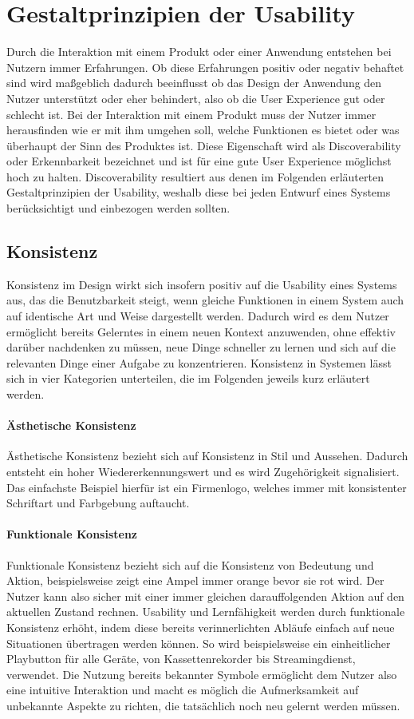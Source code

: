 \section{Gestaltprinzipien der Usability}
Durch die Interaktion mit einem Produkt oder einer Anwendung entstehen bei Nutzern immer Erfahrungen.
Ob diese Erfahrungen positiv oder negativ behaftet sind wird maßgeblich dadurch beeinflusst ob das Design der Anwendung den Nutzer unterstützt oder eher behindert, also ob die User Experience gut oder schlecht ist.
Bei der Interaktion mit einem Produkt muss der Nutzer immer herausfinden wie er mit ihm umgehen soll, welche Funktionen es bietet oder was überhaupt der Sinn des Produktes ist.
Diese Eigenschaft wird als Discoverability oder Erkennbarkeit bezeichnet und ist für eine gute User Experience möglichst hoch zu halten.
Discoverability resultiert aus denen im  Folgenden erläuterten Gestaltprinzipien der Usability, weshalb diese bei jeden Entwurf eines Systems berücksichtigt und einbezogen werden sollten\cite{Norman.2016}.

\subsection*{Konsistenz}
Konsistenz im Design wirkt sich insofern positiv auf die Usability eines Systems aus, das die Benutzbarkeit steigt, wenn gleiche Funktionen in einem System auch auf identische Art und Weise dargestellt werden.
Dadurch wird es dem Nutzer ermöglicht bereits Gelerntes in einem neuen Kontext anzuwenden, ohne effektiv darüber nachdenken zu müssen, neue Dinge schneller zu lernen und sich auf die relevanten Dinge einer Aufgabe zu konzentrieren.
Konsistenz in Systemen lässt sich in vier Kategorien unterteilen, die im Folgenden jeweils kurz erläutert werden.

\paragraph{Ästhetische Konsistenz}
Ästhetische Konsistenz bezieht sich auf Konsistenz in Stil und Aussehen. Dadurch entsteht ein hoher Wiedererkennungswert und es wird Zugehörigkeit signalisiert. Das einfachste Beispiel hierfür ist ein Firmenlogo, welches immer mit konsistenter Schriftart und Farbgebung auftaucht.

\paragraph{Funktionale Konsistenz}
Funktionale Konsistenz bezieht sich auf die Konsistenz von Bedeutung und Aktion, beispielsweise zeigt eine Ampel immer orange bevor sie rot wird. Der Nutzer kann also sicher mit einer immer gleichen darauffolgenden Aktion auf den aktuellen Zustand rechnen. 
Usability und Lernfähigkeit werden durch funktionale Konsistenz erhöht, indem diese bereits verinnerlichten Abläufe einfach auf neue Situationen übertragen werden können. So wird beispielsweise ein einheitlicher Playbutton für alle Geräte, von Kassettenrekorder bis Streamingdienst, verwendet.
Die Nutzung bereits bekannter Symbole ermöglicht dem Nutzer also eine intuitive Interaktion und macht es möglich die Aufmerksamkeit auf unbekannte Aspekte zu richten, die tatsächlich noch neu gelernt werden müssen.

